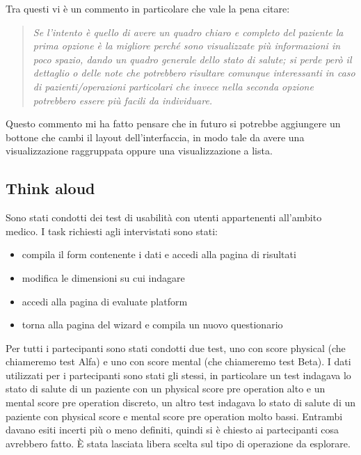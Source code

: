Tra questi vi è un commento in particolare che vale la pena citare: 
\begin{quote}
    \textit{Se l'intento è quello di avere un quadro chiaro e completo del paziente la prima opzione è la migliore perché sono visualizzate più informazioni in poco spazio, dando un quadro generale dello stato di salute; si perde però il dettaglio o delle note che potrebbero risultare comunque interessanti in caso di pazienti/operazioni particolari che invece nella seconda opzione potrebbero essere più facili da individuare.}
\end{quote}
Questo commento mi ha fatto pensare che in futuro si potrebbe aggiungere un bottone che cambi il layout dell'interfaccia, in modo tale da avere una visualizzazione raggruppata oppure una visualizzazione a lista.

\subsection{Think aloud}
Sono stati condotti dei test di usabilità con utenti appartenenti all'ambito medico.
I task richiesti agli intervistati sono stati:
\begin{itemize}
    \item compila il form contenente i dati e accedi alla pagina di risultati
    \item modifica le dimensioni su cui indagare
    \item accedi alla pagina di evaluate platform
    \item torna alla pagina del wizard e compila un nuovo questionario 
\end{itemize}

Per tutti i partecipanti sono stati condotti due test, uno con score physical (che chiameremo test Alfa) e uno con score mental (che chiameremo test Beta).
I dati utilizzati per i partecipanti sono stati gli stessi, in particolare un test indagava lo stato di salute di un paziente con un physical score pre operation alto e un mental score pre operation discreto, un altro test indagava lo stato di salute di un paziente con physical score e mental score pre operation molto bassi. Entrambi davano esiti incerti più o meno definiti, quindi si è chiesto ai partecipanti cosa avrebbero fatto. È stata lasciata libera scelta sul tipo di operazione da esplorare. 

